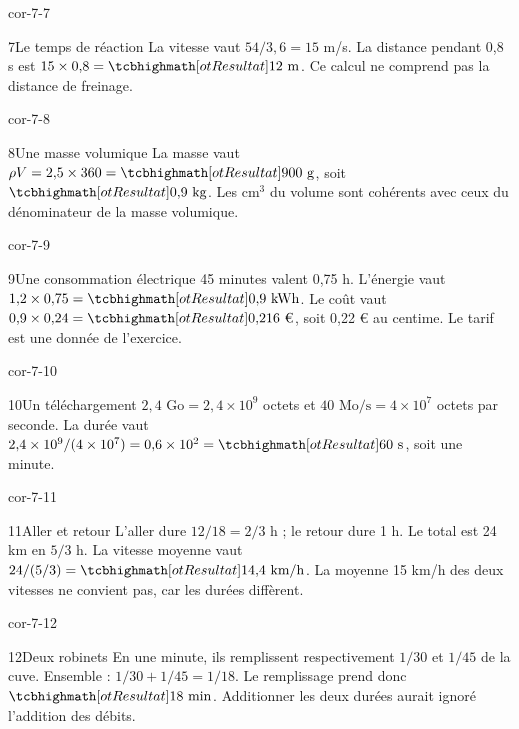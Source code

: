 \begin{blocLivre}{cor-7-7}\begin{corrige}{7}{Le temps de réaction}
La vitesse vaut $54/3{,}6=15$ m/s. La distance pendant 0,8 s est $15\times0{,}8=\res{12\text{ m}}$. Ce calcul ne comprend pas la distance de freinage.
\end{corrige}\end{blocLivre}
\begin{blocLivre}{cor-7-8}\begin{corrige}{8}{Une masse volumique}
La masse vaut $\rho V=2{,}5\times360=\res{900\text{ g}}$, soit $\res{0{,}9\text{ kg}}$. Les cm$^3$ du volume sont cohérents avec ceux du dénominateur de la masse volumique.
\end{corrige}\end{blocLivre}
\begin{blocLivre}{cor-7-9}\begin{corrige}{9}{Une consommation électrique}
45 minutes valent 0,75 h. L’énergie vaut $1{,}2\times0{,}75=\res{0{,}9\text{ kWh}}$. Le coût vaut $0{,}9\times0{,}24=\res{0{,}216\text{ €}}$, soit 0,22 € au centime. Le tarif est une donnée de l’exercice.
\end{corrige}\end{blocLivre}
\begin{blocLivre}{cor-7-10}\begin{corrige}{10}{Un téléchargement}
$2{,}4\text{ Go}=2{,}4\times10^9$ octets et $40\text{ Mo/s}=4\times10^7$ octets par seconde. La durée vaut $2{,}4\times10^9/(4\times10^7)=0{,}6\times10^2=\res{60\text{ s}}$, soit une minute.
\end{corrige}\end{blocLivre}
\begin{blocLivre}{cor-7-11}\begin{corrige}{11}{Aller et retour}
L’aller dure $12/18=2/3$ h ; le retour dure 1 h. Le total est 24 km en $5/3$ h. La vitesse moyenne vaut $24/(5/3)=\res{14{,}4\text{ km/h}}$. La moyenne 15 km/h des deux vitesses ne convient pas, car les durées diffèrent.
\end{corrige}\end{blocLivre}
\begin{blocLivre}{cor-7-12}\begin{corrige}{12}{Deux robinets}
En une minute, ils remplissent respectivement $1/30$ et $1/45$ de la cuve. Ensemble : $1/30+1/45=1/18$. Le remplissage prend donc $\res{18\text{ min}}$. Additionner les deux durées aurait ignoré l’addition des débits.
\end{corrige}\end{blocLivre}
